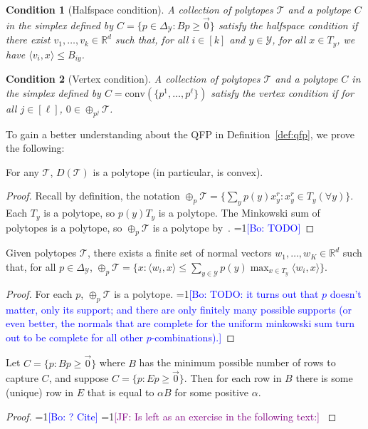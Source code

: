 \documentclass[anon]{colt2020} %
\newcommand{\Comments}{1}
\newcommand{\mynote}[2]{\ifnum\Comments=1\textcolor{#1}{#2}\fi}
\newcommand{\jessie}[1]{\mynote{purple}{[JF: #1]}}
\newcommand{\bo}[1]{\mynote{blue}{[Bo: #1]}}
\newcommand{\reals}{\mathbb{R}}
\newcommand{\simplex}{\Delta_\Y}
\newcommand{\T}{\mathcal{T}}
\newcommand{\Y}{\mathcal{Y}}
\newcommand{\inprod}[2]{\langle #1, #2 \rangle}%
\newcommand{\conv}{\mathrm{conv}}
\newtheorem{condition}{Condition}
\begin{document}
\begin{condition}[Halfspace condition]\label{cond:H-condition}
	A collection of polytopes $\T$ and a polytope $C$ in the simplex defined by $C = \{p \in \simplex : Bp \geq \vec 0\}$ \emph{satisfy the halfspace condition} if there exist $v_1, \ldots, v_k \in \reals^d$ such that, for all $i \in [k]$ and $y \in \Y$, for all $x \in T_y$, we have $\inprod{v_i}{x} \leq B_{iy}$.
\end{condition}
\begin{condition}[Vertex condition]\label{cond:V-condition}
	A collection of polytopes $\T$ and a polytope $C$ in the simplex defined by $C = \conv(\{p^1, \ldots, p^\ell\})$ \emph{satisfy the vertex condition} if for all $j \in [\ell]$, $0 \in \oplus_{p^j} \T$. %
\end{condition}

To gain a better understanding about the QFP in Definition~\ref{def:qfp}, we prove the following:
\begin{lemma} \label{lemma:D-polytope}
  For any $\T$, $D(\T)$ is a polytope (in particular, is convex).
\end{lemma}
\begin{proof}
   Recall by definition, the notation $\oplus_p \T = \{\sum_y p(y) x^r_y : x^r_y \in T_y (\forall y)\}$.
   Each $T_y$ is a polytope, so $p(y) T_y$ is a polytope.
   The Minkowski sum of polytopes is a polytope, so $\oplus_p \T$ is a polytope by~\cite[Section 1.2]{weibel2007minkowski}.
  \bo{TODO}
\end{proof}
\begin{lemma}  \label{lemma:minkowski-support}
  Given polytopes $\T$, there exists a finite set of normal vectors $w_1,\ldots,w_K \in \reals^d$ such that, for all $p \in \simplex$, $\oplus_p \T = \{x : \inprod{w_i}{x} \leq \sum_{y \in \Y} p(y) \max_{x \in T_y} \inprod{w_i}{x} \}$.
\end{lemma}
\begin{proof}
   For each $p$, $\oplus_p \T$ is a polytope.
  \bo{TODO: it turns out that $p$ doesn't matter, only its support; and there are only finitely many possible supports (or even better, the normals that are complete for the uniform minkowski sum turn out to be complete for all other $p$-combinations).}
\end{proof}
\begin{lemma} \label{lemma:E-to-B}
  Let $C = \{p : Bp \geq \vec 0 \}$ where $B$ has the minimum possible number of rows to capture $C$, and suppose $C = \{p : Ep \geq \vec 0 \}$.
  Then for each row in $B$ there is some (unique) row in $E$ that is equal to $\alpha B$ for some positive $\alpha$.
\end{lemma}
\begin{proof}
  \bo{? Cite} \jessie{Is left as an exercise in the following text:} \cite[Exercise 2.15]{ziegler2012lectures}
\end{proof}
\end{document}
